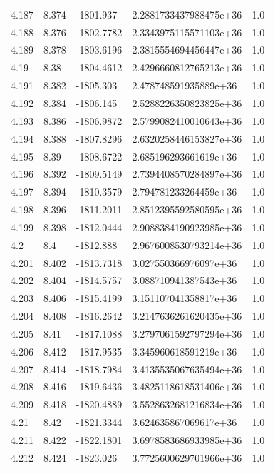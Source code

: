 \begin{tabular}{lllll}
4.187 & 8.374 & -1801.937 & 2.2881733437988475e+36 & 1.0 \\
4.188 & 8.376 & -1802.7782 & 2.3343975115571103e+36 & 1.0 \\
4.189 & 8.378 & -1803.6196 & 2.3815554694456447e+36 & 1.0 \\
4.19 & 8.38 & -1804.4612 & 2.4296660812765213e+36 & 1.0 \\
4.191 & 8.382 & -1805.303 & 2.478748591935889e+36 & 1.0 \\
4.192 & 8.384 & -1806.145 & 2.5288226350823825e+36 & 1.0 \\
4.193 & 8.386 & -1806.9872 & 2.5799082410010643e+36 & 1.0 \\
4.194 & 8.388 & -1807.8296 & 2.6320258446153827e+36 & 1.0 \\
4.195 & 8.39 & -1808.6722 & 2.685196293661619e+36 & 1.0 \\
4.196 & 8.392 & -1809.5149 & 2.7394408570284897e+36 & 1.0 \\
4.197 & 8.394 & -1810.3579 & 2.794781233264459e+36 & 1.0 \\
4.198 & 8.396 & -1811.2011 & 2.8512395592580595e+36 & 1.0 \\
4.199 & 8.398 & -1812.0444 & 2.9088384190923985e+36 & 1.0 \\
4.2 & 8.4 & -1812.888 & 2.9676008530793214e+36 & 1.0 \\
4.201 & 8.402 & -1813.7318 & 3.027550366976097e+36 & 1.0 \\
4.202 & 8.404 & -1814.5757 & 3.088710941387543e+36 & 1.0 \\
4.203 & 8.406 & -1815.4199 & 3.151107041358817e+36 & 1.0 \\
4.204 & 8.408 & -1816.2642 & 3.2147636261620435e+36 & 1.0 \\
4.205 & 8.41 & -1817.1088 & 3.2797061592797294e+36 & 1.0 \\
4.206 & 8.412 & -1817.9535 & 3.345960618591219e+36 & 1.0 \\
4.207 & 8.414 & -1818.7984 & 3.4135535067635494e+36 & 1.0 \\
4.208 & 8.416 & -1819.6436 & 3.4825118618531406e+36 & 1.0 \\
4.209 & 8.418 & -1820.4889 & 3.5528632681216834e+36 & 1.0 \\
4.21 & 8.42 & -1821.3344 & 3.624635867069617e+36 & 1.0 \\
4.211 & 8.422 & -1822.1801 & 3.6978583686933985e+36 & 1.0 \\
4.212 & 8.424 & -1823.026 & 3.7725600629701966e+36 & 1.0 \\

\end{tabular}
